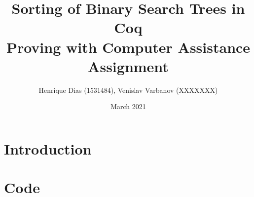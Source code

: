 \documentclass[a4paper]{article}
\title{%
  Sorting of Binary Search Trees in Coq \\
  \large Proving with Computer Assistance Assignment}
\author{Henrique Dias (1531484), Venislav Varbanov (XXXXXXX)}
\date{March 2021}
\begin{document}
\maketitle



\section{Introduction}

\appendix

\section{Code}


\end{document}
